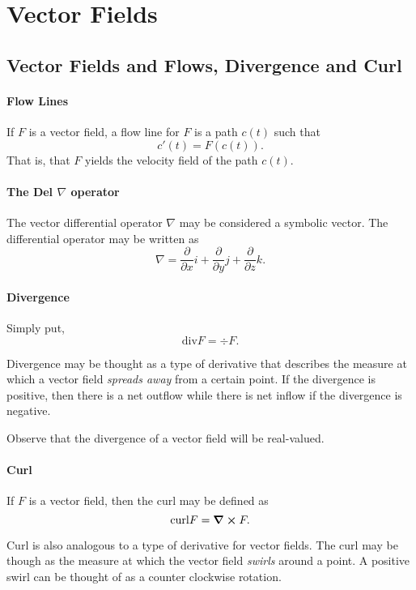 \documentclass[12pt, letterpaper]{article}
\begin{document}
    
    
    \section{Vector Fields}

    \subsection{Vector Fields and Flows, Divergence and Curl}
    \paragraph{Flow Lines}
    If \(F\) is a vector field, a flow line for \(F\) is a path \(c(t)\)
    such that
    \[c'(t) = F(c(t)).\]
    That is, that \(F\) yields the velocity field of the path \(c(t)\).

    \paragraph{The Del \(\nabla\) operator}
    The vector differential operator \(\nabla\) may be considered a 
    symbolic vector.
    The differential operator may be written as 
    \[\nabla = \frac{\partial}{\partial x}i + \frac{\partial}{\partial y}j + \frac{\partial}{\partial z}k.\]

    \paragraph{Divergence}
    Simply put, \[\text{div} F = \div F.\]

    Divergence may be thought as a type of derivative that describes the measure at which 
    a vector field \textit{spreads away} from a certain point.
    If the divergence is positive, then there is a net outflow while there is net inflow if the divergence is negative.

    Observe that the divergence of a vector field will be real-valued.

    \paragraph{Curl}
    If \(F\) is a vector field, then the curl may be defined as
    \[\mathrm{curl}F = \curl F.\]

    Curl is also analogous to a type of derivative for vector fields. The curl may be though as the measure at which the vector field \textit{swirls} around a point.
    A positive swirl can be thought of as a counter clockwise rotation.
\end{document}
